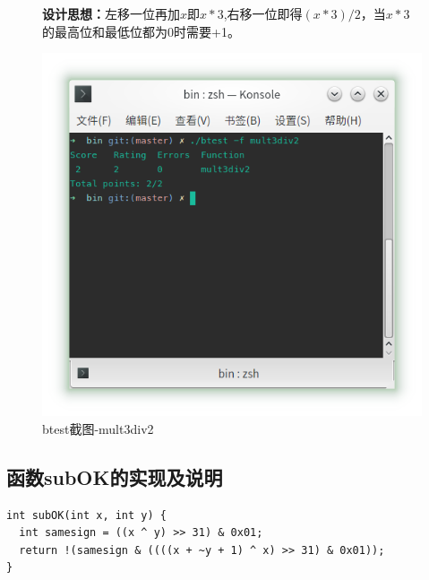 \begin{figure}[H]
    \begin{minipage}[c]{0.5\linewidth}
        \textbf{设计思想：}左移一位再加$x$即$x*3$,右移一位即得$(x*3)/2$，当$x*3$的最高位和最低位都为0时需要+1。
    \end{minipage}
    \begin{minipage}[c]{0.4\linewidth}
        \centering
        \includegraphics[width=0.9\linewidth]{figures/mult3div2}
        \caption{btest截图-mult3div2}
        \label{fig:mult3div2}
    \end{minipage}
\end{figure}

\subsection{函数subOK的实现及说明}

\begin{verbatim}
int subOK(int x, int y) {
  int samesign = ((x ^ y) >> 31) & 0x01;
  return !(samesign & ((((x + ~y + 1) ^ x) >> 31) & 0x01));
}
\end{verbatim}

